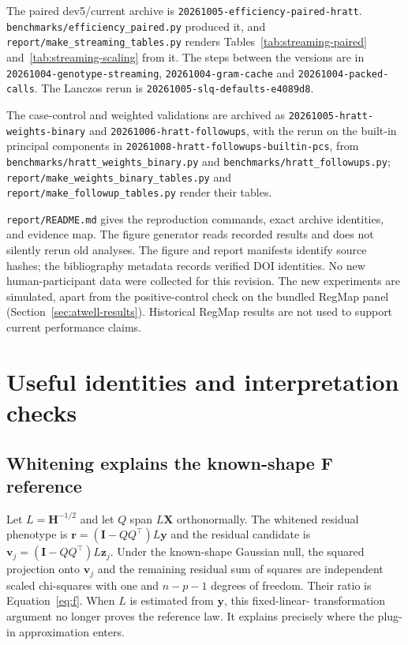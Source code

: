 \documentclass[11pt]{article}
\newcommand{\y}{\mathbf{y}}
\newcommand{\z}{\mathbf{z}}
\newcommand{\X}{\mathbf{X}}
\newcommand{\I}{\mathbf{I}}
\newcommand{\Hm}{\mathbf{H}}
\newcommand{\code}[1]{\texttt{#1}}
\begin{document}
The paired dev5/current archive is
\code{20261005-}\allowbreak\code{efficiency-paired-}\allowbreak\code{hratt}.
\code{benchmarks/}\allowbreak\code{efficiency\_paired.py} produced it, and
\code{report/}\allowbreak\code{make\_streaming\_tables.py} renders
Tables~\ref{tab:streaming-paired} and~\ref{tab:streaming-scaling} from it.
The steps between the versions are in
\code{20261004-}\allowbreak\code{genotype-streaming},
\code{20261004-}\allowbreak\code{gram-cache} and
\code{20261004-}\allowbreak\code{packed-calls}. The Lanczos rerun is
\code{20261005-}\allowbreak\code{slq-defaults-}\allowbreak\code{e4089d8}.

The case-control and weighted validations are archived as
\code{20261005-}\allowbreak\code{hratt-weights-binary} and
\code{20261006-}\allowbreak\code{hratt-followups}, with the rerun on the
built-in principal components in
\code{20261008-}\allowbreak\code{hratt-followups-}\allowbreak\code{builtin-pcs}, from
\code{benchmarks/}\allowbreak\code{hratt\_weights\_binary.py} and
\code{benchmarks/}\allowbreak\code{hratt\_followups.py};
\code{report/}\allowbreak\code{make\_weights\_}\allowbreak\code{binary\_tables.py}
and \code{report/}\allowbreak\code{make\_followup\_}\allowbreak\code{tables.py}
render their tables.

\code{report/README.md} gives the reproduction commands, exact archive
identities, and evidence map. The figure generator reads recorded results and does not silently
rerun old analyses. The figure and report manifests identify source
hashes; the bibliography metadata records verified DOI identities.
No new human-participant data were collected for this revision. The
new experiments are simulated, apart from the positive-control check on
the bundled RegMap panel (Section~\ref{sec:atwell-results}). Historical
RegMap results are not used to support current performance claims.

\appendix
\section{Useful identities and interpretation checks}
\label{sec:appendix}

\subsection{Whitening explains the known-shape F reference}

Let $L=\Hm^{-1/2}$ and let $Q$ span $L\X$ orthonormally. The whitened
residual phenotype is $\mathbf r=(\I-QQ^\top)L\y$ and the residual
candidate is $\mathbf v_j=(\I-QQ^\top)L\z_j$. Under the known-shape
Gaussian null, the squared projection onto $\mathbf v_j$ and the
remaining residual sum of squares are independent scaled chi-squares
with one and $n-p-1$ degrees of freedom. Their ratio is
Equation~\eqref{eq:f}. When $L$ is estimated from $\y$, this fixed-linear-
transformation argument no longer proves the reference law. It explains
precisely where the plug-in approximation enters.
\end{document}
